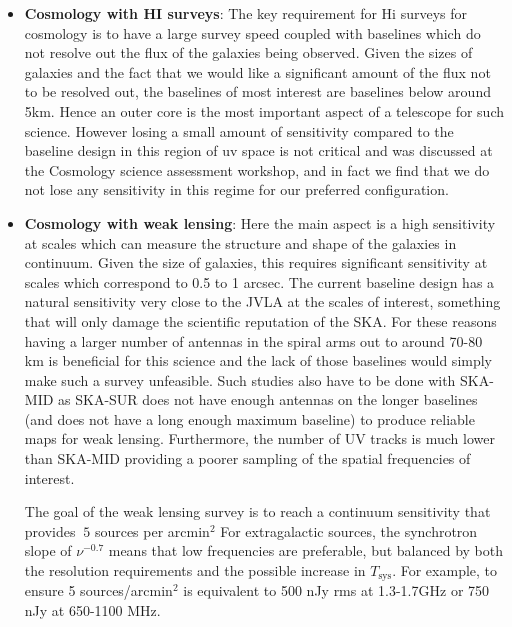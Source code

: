 \documentclass[sfheadings,a4paper,times,9pt,floats,floatfix]{article}
\begin{document}
\begin{itemize}
\item {\bf Cosmology with HI surveys}: The key requirement for H{\sc i}
surveys for cosmology is to have a large
survey speed coupled with baselines which do not resolve out the flux of the galaxies being
observed. Given the sizes of galaxies and the fact that we would like a significant amount of
the flux not to be resolved out, the baselines of most interest are baselines below around
5km. Hence an outer core is the most important aspect of a telescope for such science.
However losing a small amount of sensitivity compared to the baseline design in this region
of uv space is not critical and was discussed at the Cosmology science
assessment workshop, and in fact we find that we do not lose any
sensitivity in this regime for our preferred configuration. 

\item {\bf Cosmology with weak lensing}: Here the main aspect is a high sensitivity at scales which can
measure the structure and shape of the galaxies in continuum. Given the size of galaxies,
this requires significant sensitivity at scales which correspond to
0.5 to 1 arcsec. The current baseline design has a natural sensitivity
very close to the JVLA at the scales of interest, something that will
only damage the scientific reputation of the SKA. 
For these reasons having a larger number of antennas in the spiral arms out to around 70-80
km is beneficial for this science and the lack of those baselines would simply make such a
survey unfeasible. Such studies also have to be done with SKA-MID as SKA-SUR does not have
enough antennas on the longer baselines (and does not have a long
enough maximum baseline) to produce reliable maps for weak
lensing. Furthermore,  the number of UV tracks is much lower than
SKA-MID providing a poorer sampling of the spatial frequencies of
interest. 

The goal of the weak lensing survey is to reach a continuum sensitivity that provides $~5$ sources per arcmin$^2$ 
For extragalactic sources, the synchrotron slope of $\nu^{-0.7}$ means that low frequencies are preferable, but 
balanced by both the resolution requirements and the possible increase in $T_\mathrm{sys}$. For example, to ensure 5 
sources/arcmin$^2$ is equivalent to 500 nJy rms at 1.3-1.7GHz or 750 nJy at 650-1100 MHz.



\end{itemize}
\end{document}
